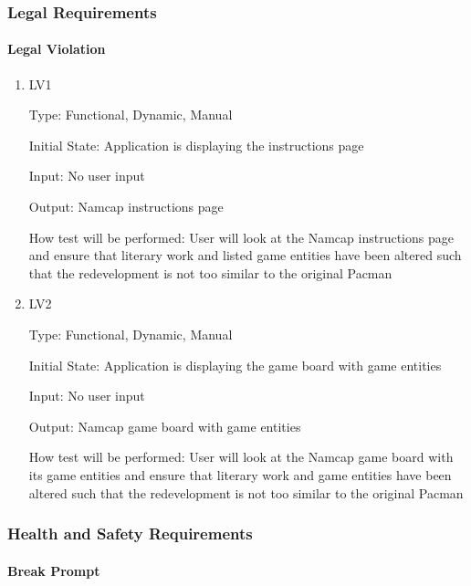 \documentclass[12pt, titlepage]{article}
\begin{document}
\subsubsection{Legal Requirements}

\paragraph{Legal Violation}

\begin{enumerate}

\item{LV1\\}

Type: Functional, Dynamic, Manual
					
Initial State: Application is displaying the instructions page
					
Input: No user input
					
Output: Namcap instructions page
					
How test will be performed: User will look at the Namcap instructions page and ensure that literary work and listed game entities have been altered such that the redevelopment is not too similar to the original Pacman
					
\item{LV2\\}

Type: Functional, Dynamic, Manual
					
Initial State: Application is displaying the game board with game entities
					
Input: No user input
					
Output: Namcap game board with game entities
					
How test will be performed: User will look at the Namcap game board with its game entities and ensure that literary work and game entities have been altered such that the redevelopment is not too similar to the original Pacman

\end{enumerate}

\subsubsection{Health and Safety Requirements}

\paragraph{Break Prompt}
\end{document}
